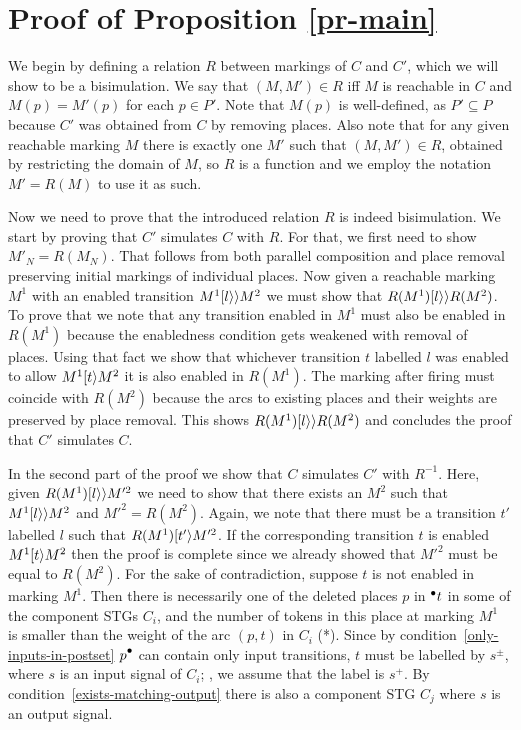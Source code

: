 \section{Proof of Proposition \ref{pr-main}}

We begin by defining a relation $R$ between markings of $C$ and $C'$, which we will show to be a bisimulation.
We say that $(M,M') \in R$ iff $M$ is reachable in $C$ and 
$M(p)=M'(p)$ for each $p \in P'$.
Note that $M(p)$ is well-defined, as $P' \subseteq P$ because $C'$ was obtained from $C$ by removing places.
Also note that for any given reachable marking $M$ there is exactly one $M'$ such that $(M,M') \in R$, obtained by 
restricting the domain of $M$, so $R$ is a function and we employ the notation $M' = R(M)$ to use it as such.

Now we need to prove that the introduced relation $R$ is indeed bisimulation. 
We start by proving that $C'$ simulates $C$ with $R$.
For that, we first need to show $M'_N = R(M_N)$. That follows from both parallel composition and place removal preserving initial markings of individual places.
Now given a reachable marking $M^1$ with an enabled transition $M^1 [l\rangle\rangle M^2$ we must show that $R(M^1) [l\rangle\rangle R(M^2)$. To prove that we note that any transition enabled in $M^1$ must also be enabled in $R(M^1)$ because the enabledness condition gets weakened with removal of places. Using that fact we show that whichever transition $t$ labelled $l$ was enabled to allow $M^1 [t\rangle M^2$ it is also enabled in $R(M^1)$. The marking after firing must coincide with $R(M^2)$ because the arcs to existing places and their weights are preserved by place removal. This shows $R(M^1) [l\rangle\rangle R(M^2)$ and concludes the proof that $C'$ simulates $C$.

In the second part of the proof we show that $C$ simulates $C'$ with $R^{-1}$. Here, given $R(M^1) [l\rangle\rangle M'^2$ we need to show that there exists an $M^2$ such that $M^1 [l\rangle\rangle M^2$ and $M'^2 = R(M^2)$. Again, we note that there must be a transition $t'$ labelled $l$ such that $R(M^1) [t'\rangle M'^2$. If the corresponding transition $t$ is enabled $M^1 [t\rangle M^2$ then the proof is complete since we already showed that $M'^2$ must be equal to $R(M^2)$. For the sake of contradiction, suppose $t$ is not enabled in marking $M^1$. Then there is necessarily one of the deleted places $p$ in ${}^\bullet {t}$ in some of the component STGs $C_i$, and the number of tokens in this place at marking $M^1$ is
smaller than the weight of the arc $(p,t)$ in $C_i$ (*).
Since by condition~\ref{only-inputs-in-postset} $\post{p}$ can
contain only input transitions, $t$ must be labelled by
$s^\pm$, where $s$ is an input signal of $C_i$; \wlogg, we
assume that the label is $s^+$. By
condition~\ref{exists-matching-output} there is also a
component STG $C_j$ where $s$ is an output signal.

